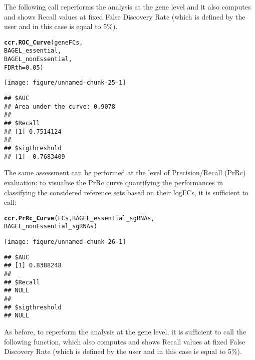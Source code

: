 \documentclass{article}\usepackage[]{graphicx}\usepackage[]{color}
\makeatletter
\def\maxwidth{ %
  \ifdim\Gin@nat@width>\linewidth
    \linewidth
  \else
    \Gin@nat@width
  \fi
}
\newcommand{\hlnum}[1]{\textcolor[rgb]{0.686,0.059,0.569}{#1}}%
\newcommand{\hlstd}[1]{\textcolor[rgb]{0.345,0.345,0.345}{#1}}%
\newcommand{\hlkwc}[1]{\textcolor[rgb]{0.333,0.667,0.333}{#1}}%
\newcommand{\hlkwd}[1]{\textcolor[rgb]{0.737,0.353,0.396}{\textbf{#1}}}%
\newenvironment{kframe}{%
 \def\at@end@of@kframe{}%
 \ifinner\ifhmode%
  \def\at@end@of@kframe{\end{minipage}}%
  \begin{minipage}{\columnwidth}%
 \fi\fi%
 \def\FrameCommand##1{\hskip\@totalleftmargin \hskip-\fboxsep
 \colorbox{shadecolor}{##1}\hskip-\fboxsep
     \hskip-\linewidth \hskip-\@totalleftmargin \hskip\columnwidth}%
 \MakeFramed {\advance\hsize-\width
   \@totalleftmargin\z@ \linewidth\hsize
   \@setminipage}}%
 {\par\unskip\endMakeFramed%
 \at@end@of@kframe}
\newenvironment{knitrout}{}{} %
\makeatother
\begin{document}
The following call reperforms the analysis at the gene level and it also computes and shows Recall values at fixed False Discovery Rate (which is defined by the user and in this case is equal to 5\%).

\begin{knitrout}
\color{fgcolor}\begin{kframe}
\begin{alltt}
\hlkwd{ccr.ROC_Curve}\hlstd{(geneFCs,}
                         \hlstd{BAGEL_essential,}
                         \hlstd{BAGEL_nonEssential,}
                         \hlkwc{FDRth} \hlstd{=} \hlnum{0.05}\hlstd{)}
\end{alltt}
\end{kframe}
\texttt{[image: figure/unnamed-chunk-25-1]} 
\begin{kframe}\begin{verbatim}
## $AUC
## Area under the curve: 0.9078
## 
## $Recall
## [1] 0.7514124
## 
## $sigthreshold
## [1] -0.7683409
\end{verbatim}
\end{kframe}
\end{knitrout}
 
 
The same assessment can be performed at the level of Precision/Recall (PrRc) evaluation: to visualise the PrRc curve quantifying the performances in classifying the considered reference sets based on their logFCs, it is sufficient to call:
\begin{knitrout}
\color{fgcolor}\begin{kframe}
\begin{alltt}
\hlkwd{ccr.PrRc_Curve}\hlstd{(FCs,BAGEL_essential_sgRNAs,}
                              \hlstd{BAGEL_nonEssential_sgRNAs)}
\end{alltt}
\end{kframe}
\texttt{[image: figure/unnamed-chunk-26-1]} 
\begin{kframe}\begin{verbatim}
## $AUC
## [1] 0.8388248
## 
## $Recall
## NULL
## 
## $sigthreshold
## NULL
\end{verbatim}
\end{kframe}
\end{knitrout}
% 
As before, to reperform the analysis at the gene level, it is sufficient to call the following function, which also computes and shows Recall values at fixed False Discovery Rate (which is defined by the user and in this case is equal to 5\%).
\end{document}
